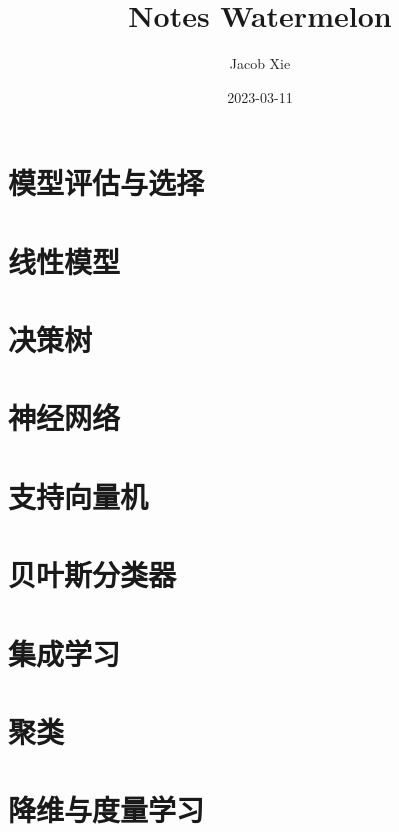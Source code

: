 \documentclass[UTF8]{ctexart}
\title{Notes Watermelon}
\author{Jacob Xie}
\date{2023-03-11}
\numberwithin{equation}{section}
\begin{document}
\maketitle
\newpage

\section{模型评估与选择}

\newpage

\section{线性模型}

\newpage

\section{决策树}
% 
\newpage

\section{神经网络}

\newpage

\newpage

\section{支持向量机}
% 
\newpage

\section{贝叶斯分类器}
% 
\newpage

\section{集成学习}
% 
\newpage

\section{聚类}
% 
\newpage

\section{降维与度量学习}
% 
\newpage
\end{document}
